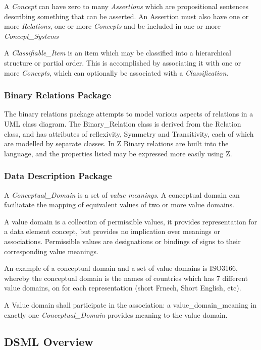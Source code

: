 \documentclass{llncs}
\begin{document}
A \emph{Concept} can have zero to many \emph{Assertions} which are propositional sentences describing something that can be asserted. An Assertion must also have one or more \emph{Relations}, one or more \emph{Concepts} and be included in one or more \emph{Concept\_Systems}

A \emph{Classifiable\_Item} is an item which may be classified into a hierarchical structure or partial order. This is accomplished by associating it with one or more \emph{Concepts}, which can optionally be associated with a \emph{Classification}. 

\subsubsection{Binary Relations Package}
The binary relations package attempts to model various aspects of relations in a UML class diagram. The Binary\_Relation class is derived from the Relation class, and has attributes of reflexivity, Symmetry and Transitivity, each of which are modelled by separate classes. In Z Binary relations are built into the language, and the properties listed may be expressed more easily using Z.

\subsubsection{Data Description Package}
A \emph{Conceptual\_Domain} is a set of \emph{value meanings}. A conceptual domain can faciliatate the mapping of equivalent values of two or more value domains.

A value domain is a collection of permissible values, it provides representation for a data element concept, but provides no implication over meanings or associations. Permissible values are designations or bindings of signs to their corresponding value meanings.

An example of a conceptual domain and a set of value domains is ISO3166, whereby the conceptual domain is the names of countries which has 7 different value domains, on for each representation (short Frnech, Short English, etc).

A Value domain shall participate in the association: a value\_domain\_meaning in exactly one \emph{Conceptual\_Domain} provides meaning to the value domain.






\subsection{DSML Overview}
\end{document}
